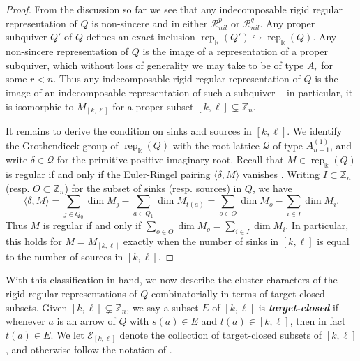 \documentclass[12pt]{amsart}
\newcommand{\sayHW}[1]{\say[HW]{\color{violet}{\bf HW:}\;#1}}
\newcommand{\sayDR}[1]{\say[DR]{\color{red}{\bf DR:}\;#1}}
\newcommand{\newword}[1]{\textbf{\emph{#1}}}
\newcommand{\ZZ}{\mathbb{Z}}
\newcommand{\kk}{\Bbbk}
\newcommand{\bfg}{\mathbf{g}}
\newcommand{\cE}{\mathcal{E}}
\newcommand{\cQ}{\mathcal{Q}}
\newcommand{\cR}{\mathcal{R}}
\newcommand{\rep}{\operatorname{rep}}
\newcommand\into{\hookrightarrow}
\newcommand{\Qrep}{M}
\theoremstyle{remark}
\numberwithin{equation}{section}
\numberwithin{figure}{section}
\begin{document}
\begin{proof}
  From the discussion so far we see that any indecomposable rigid regular representation of $Q$ is non-sincere and in either $\cR_{nil}^p$ or $\cR_{nil}^q$.
  Any proper subquiver $Q'$ of $Q$ defines an exact inclusion $\rep_\kk(Q') \into \rep_\kk(Q)$.
  Any non-sincere representation of $Q$ is the image of a representation of a proper subquiver, which without loss of generality we may take to be of type $A_r$ for some $r < n$.
  Thus any indecomposable rigid regular representation of $Q$ is the image of an indecomposable representation of such a subquiver -- in particular, it is isomorphic to $\Qrep_{[k,\ell]}$ for a proper subset $[k,\ell]\subsetneq\ZZ_n$.

  It remains to derive the condition on sinks and sources in $[k,\ell]$.
  We identify the Grothendieck group of $\rep_\kk(Q)$ with the root lattice $\cQ$ of type $A_{n-1}^{\!(1)}$, and write $\delta\in\cQ$ for the primitive positive imaginary root.
  Recall that $\Qrep \in \rep_\kk(Q)$ is regular if and only if the Euler-Ringel pairing $\langle\delta,\Qrep\rangle$ vanishes \cite[Sec. 7]{CrBo92}.
  Writing $I \subset \ZZ_n$ (resp. $O \subset \ZZ_n$) for the subset of sinks (resp. sources) in $Q$, we have  
  \[
    \langle\delta,\Qrep\rangle
    =
    \sum_{j\in Q_0}\dim \Qrep_j-\sum_{a\in Q_1}\dim \Qrep_{t(a)}
    =
    \sum_{o\in O}\dim \Qrep_o-\sum_{i\in I}\dim \Qrep_i.
  \]
  Thus $\Qrep$ is regular if and only if $\sum\limits_{o\in O}\dim \Qrep_o=\sum\limits_{i\in I}\dim \Qrep_i$.
  In particular, this holds for $\Qrep = \Qrep_{[k,\ell]}$ exactly when the number of sinks in $[k,\ell]$ is equal to the number of sources in $[k,\ell]$.
\end{proof}

With this classification in hand, we now describe the cluster characters of the rigid regular representations of $Q$ combinatorially in terms of target-closed subsets.
Given $[k,\ell]\subsetneq\ZZ_n$, we say a subset $E$ of $[k,\ell]$ is \newword{target-closed} if whenever $a$ is an arrow of $Q$ with $s(a) \in E$ and $t(a) \in [k,\ell]$, then in fact $t(a) \in E$.
We let $\cE_{[k,\ell]}$ denote the collection of target-closed subsets of $[k,\ell]$, and otherwise follow the notation of .
\end{document}
